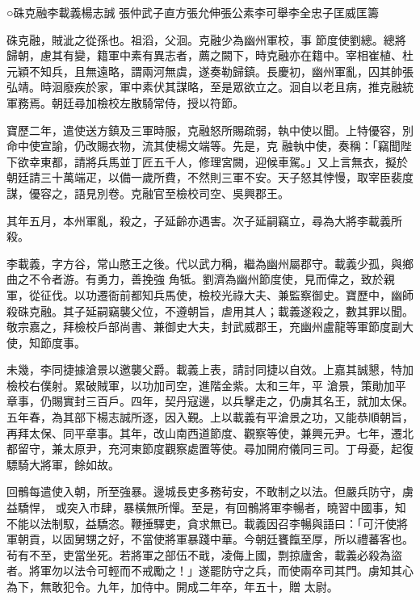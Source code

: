 
\begin{pinyinscope}

 ○硃克融李載義楊志誠
 張仲武子直方張允伸張公素李可舉李全忠子匡威匡籌



 硃克融，賊泚之從孫也。祖滔，父洄。克融少為幽州軍校，事
 節度使劉總。總將歸朝，慮其有變，籍軍中素有異志者，薦之闕下，時克融亦在籍中。宰相崔植、杜元穎不知兵，且無遠略，謂兩河無虞，遂奏勒歸鎮。長慶初，幽州軍亂，囚其帥張弘靖。時洄廢疾於家，軍中素伏其謀略，至是眾欲立之。洄自以老且病，推克融統軍務焉。朝廷尋加檢校左散騎常侍，授以符節。



 寶歷二年，遣使送方鎮及三軍時服，克融怒所賜疏弱，執中使以聞。上特優容，別命中使宣諭，仍改賜衣物，流其使楊文端等。先是，克
 融執中使，奏稱：「竊聞陛下欲幸東都，請將兵馬並丁匠五千人，修理宮闕，迎候車駕。」又上言無衣，擬於朝廷請三十萬端疋，以備一歲所費，不然則三軍不安。天子怒其悖慢，取宰臣裴度謀，優容之，語見別卷。克融官至檢校司空、吳興郡王。



 其年五月，本州軍亂，殺之，子延齡亦遇害。次子延嗣竊立，尋為大將李載義所殺。



 李載義，字方谷，常山愍王之後。代以武力稱，繼為幽州屬郡守。載義少孤，與鄉曲之不令者游。有勇力，善挽強
 角牴。劉濟為幽州節度使，見而偉之，致於親軍，從征伐。以功遷衙前都知兵馬使，檢校光祿大夫、兼監察御史。寶歷中，幽師殺硃克融。其子延嗣竊襲父位，不遵朝旨，虐用其人；載義遂殺之，數其罪以聞。敬宗嘉之，拜檢校戶部尚書、兼御史大夫，封武威郡王，充幽州盧龍等軍節度副大使，知節度事。



 未幾，李同捷據滄景以邀襲父爵。載義上表，請討同捷以自效。上嘉其誠懇，特加檢校右僕射。累破賊軍，以功加司空，進階金紫。太和三年，平
 滄景，策勛加平章事，仍賜實封三百戶。四年，契丹寇邊，以兵擊走之，仍虜其名王，就加太保。五年春，為其部下楊志誠所逐，因入覲。上以載義有平滄景之功，又能恭順朝旨，再拜太保、同平章事。其年，改山南西道節度、觀察等使，兼興元尹。七年，遷北都留守，兼太原尹，充河東節度觀察處置等使。尋加開府儀同三司。丁母憂，起復驃騎大將軍，餘如故。



 回鶻每遣使入朝，所至強暴。邊城長吏多務茍安，不敢制之以法。但嚴兵防守，虜益驕悍，
 或突入市肆，暴橫無所憚。至是，有回鶻將軍李暢者，曉習中國事，知不能以法制馭，益驕恣。鞭捶驛吏，貪求無已。載義因召李暢與語曰：「可汗使將軍朝貢，以固舅甥之好，不當使將軍暴踐中華。今朝廷饔餼至厚，所以禮蕃客也。茍有不至，吏當坐死。若將軍之部伍不戢，凌侮上國，剽掠廬舍，載義必殺為盜者。將軍勿以法令可輕而不戒勵之！」遂罷防守之兵，而使兩卒司其門。虜知其心為下，無敢犯令。九年，加侍中。開成二年卒，年五十，贈
 太尉。




\end{pinyinscope}
